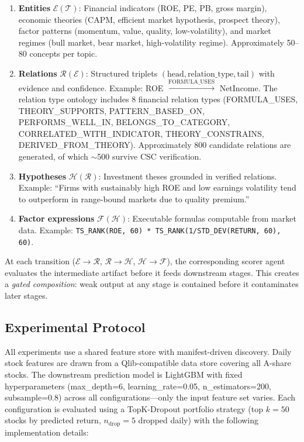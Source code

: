 \documentclass[sigconf]{acmart}
\begin{document}
\begin{enumerate}
    \item \textbf{Entities} $\mathcal{E}(\mathcal{T})$: Financial indicators (ROE, PE, PB, gross margin), economic theories (CAPM, efficient market hypothesis, prospect theory), factor patterns (momentum, value, quality, low-volatility), and market regimes (bull market, bear market, high-volatility regime). Approximately 50--80 concepts per topic.
    \item \textbf{Relations} $\mathcal{R}(\mathcal{E})$: Structured triplets $(\text{head}, \text{relation\_type}, \text{tail})$ with evidence and confidence. Example: ROE $\xrightarrow{\text{FORMULA\_USES}}$ NetIncome. The relation type ontology includes 8 financial relation types (FORMULA\_USES, THEORY\_SUPPORTS, PATTERN\_BASED\_ON, PERFORMS\_WELL\_IN, BELONGS\_TO\_CATEGORY, CORRELATED\_WITH\_INDICATOR, THEORY\_CONSTRAINS, DERIVED\_FROM\_THEORY). Approximately 800 candidate relations are generated, of which $\sim$500 survive CSC verification.
    \item \textbf{Hypotheses} $\mathcal{H}(\mathcal{R})$: Investment theses grounded in verified relations. Example: ``Firms with sustainably high ROE and low earnings volatility tend to outperform in range-bound markets due to quality premium.''
    \item \textbf{Factor expressions} $\mathcal{F}(\mathcal{H})$: Executable formulas computable from market data. Example: \texttt{TS\_RANK(ROE, 60) * TS\_RANK(1/STD\_DEV(RETURN, 60), 60)}.
\end{enumerate}

At each transition ($\mathcal{E} \to \mathcal{R}$, $\mathcal{R} \to \mathcal{H}$, $\mathcal{H} \to \mathcal{F}$), the corresponding scorer agent evaluates the intermediate artifact before it feeds downstream stages. This creates a \textit{gated composition}: weak output at any stage is contained before it contaminates later stages.

\subsection{Experimental Protocol}

All experiments use a shared feature store with manifest-driven discovery. Daily stock features are drawn from a Qlib-compatible data store covering all A-share stocks. The downstream prediction model is LightGBM with fixed hyperparameters (max\_depth=6, learning\_rate=0.05, n\_estimators=200, subsample=0.8) across all configurations---only the input feature set varies. Each configuration is evaluated using a TopK-Dropout portfolio strategy (top $k=50$ stocks by predicted return, $n_{\text{drop}}=5$ dropped daily) with the following implementation details:
\end{document}
